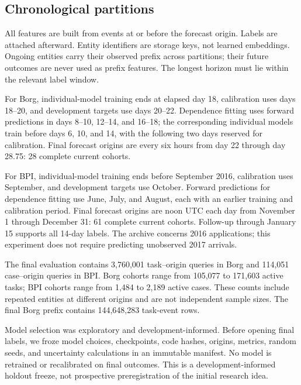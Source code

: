 \subsection{Chronological partitions}
All features are built from events at or before the forecast origin. Labels
are attached afterward. Entity identifiers are storage keys, not learned
embeddings. Ongoing entities carry their observed prefix across partitions;
their future outcomes are never used as prefix features. The longest horizon
must lie within the relevant label window.

For Borg, individual-model training ends at elapsed day 18, calibration uses
days 18--20, and development targets use days 20--22. Dependence fitting uses
forward predictions in days 8--10, 12--14, and 16--18; the corresponding
individual models train before days 6, 10, and 14, with the following two days
reserved for calibration. Final forecast origins are every six hours from
day 22 through day 28.75: 28 complete current cohorts.

For BPI, individual-model training ends before September 2016, calibration
uses September, and development targets use October. Forward predictions for
dependence fitting use June, July, and August, each with an earlier training
and calibration period. Final forecast origins are noon UTC each day from
November 1 through December 31: 61 complete current cohorts. Follow-up through
January 15 supports all 14-day labels. The archive concerns 2016 applications;
this experiment does not require predicting unobserved 2017 arrivals.

The final evaluation contains 3,760,001 task--origin queries in Borg and
114,051 case--origin queries in BPI. Borg cohorts range from 105,077 to 171,603
active tasks; BPI cohorts range from 1,484 to 2,189 active cases. These counts
include repeated entities at different origins and are not independent sample
sizes. The final Borg prefix contains 144,648,283 task-event rows.

Model selection was exploratory and development-informed. Before opening final
labels, we froze model choices, checkpoints, code hashes, origins, metrics,
random seeds, and uncertainty calculations in an immutable manifest. No model
is retrained or recalibrated on final outcomes. This is a development-informed
holdout freeze, not prospective preregistration of the initial research idea.

